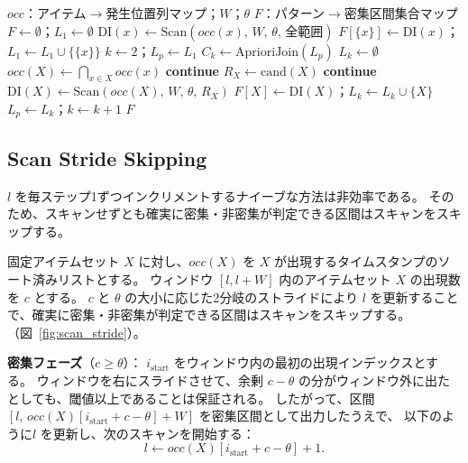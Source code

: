 \begin{algorithm}[t]
\caption{Apriori-Window（単一スキャン）}\label{alg:aw}
\begin{algorithmic}[1]
\Require $\mathit{occ}$：アイテム$\to$発生位置列マップ；$W$；$\theta$
\Ensure $F$：パターン$\to$密集区間集合マップ
\State $F \leftarrow \emptyset$；$L_1 \leftarrow \emptyset$
  \State $\mathrm{DI}(x) \leftarrow \mathrm{Scan}(\mathit{occ}(x),\, W,\, \theta,\, \text{全範囲})$
    \State $F[\{x\}] \leftarrow \mathrm{DI}(x)$；$L_1 \leftarrow L_1 \cup \{\{x\}\}$
  \EndIf
\EndFor
\State $k \leftarrow 2$；$L_p \leftarrow L_1$
  \State $C_k \leftarrow \mathrm{AprioriJoin}(L_p)$
  \State $L_k \leftarrow \emptyset$
    \State $\mathit{occ}(X) \leftarrow \bigcap_{x \in X} \mathit{occ}(x)$
     \textbf{continue} \EndIf
    \State $R_X \leftarrow \mathrm{cand}(X)$
     \textbf{continue} \EndIf
    \State $\mathrm{DI}(X) \leftarrow \mathrm{Scan}(\mathit{occ}(X),\, W,\, \theta,\, R_X)$
      \State $F[X] \leftarrow \mathrm{DI}(X)$；$L_k \leftarrow L_k \cup \{X\}$
    \EndIf
  \EndFor
  \State $L_p \leftarrow L_k$；$k \leftarrow k + 1$
\EndWhile
\State \Return $F$
\end{algorithmic}
\end{algorithm}

\subsection{Scan Stride Skipping}

$l$ を毎ステップ1ずつインクリメントするナイーブな方法は非効率である。
そのため、スキャンせずとも確実に密集・非密集が判定できる区間はスキャンをスキップする。

固定アイテムセット $X$ に対し、$\mathit{occ}(X)$ を $X$ が出現するタイムスタンプのソート済みリストとする。
ウィンドウ $[l, l{+}W]$ 内のアイテムセット $X$ の出現数を $c$ とする。
$c$ と $\theta$ の大小に応じた2分岐のストライドにより $l$ を更新することで、確実に密集・非密集が判定できる区間はスキャンをスキップする。（図~\ref{fig:scan_stride}）。

\textbf{密集フェーズ}（$c \geq \theta$）：
$i_{\mathrm{start}}$ をウィンドウ内の最初の出現インデックスとする。
ウィンドウを右にスライドさせて、余剰 $c - \theta$ の分がウィンドウ外に出たとしても、閾値以上であることは保証される。
したがって、区間 $[l,\, \mathit{occ}(X)[i_{\mathrm{start}} + c - \theta] + W]$ を密集区間として出力したうえで、
以下のように$l$ を更新し、次のスキャンを開始する：
\begin{equation}\label{eq:stride_dense}
  l \leftarrow \mathit{occ}(X)[i_{\mathrm{start}} + c - \theta] + 1.
\end{equation}

